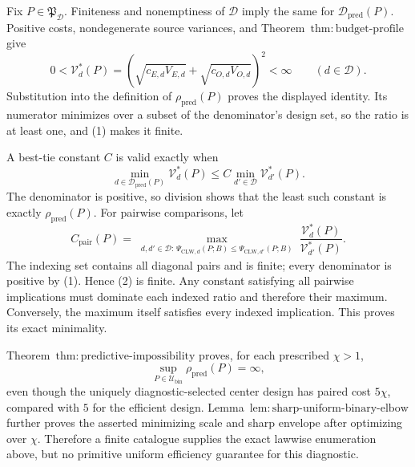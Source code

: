 Fix \(P\in\mathfrak P_{\mathcal D}\).  Finiteness and nonemptiness of \(\mathcal D\) imply the same for \(\mathcal D_{\mathrm{pred}}(P)\).  Positive costs, nondegenerate source variances, and Theorem~\(\mathrm{thm{:}budget\text{-}profile}\) give
\[
 0<\mathcal V_d^*(P)
 =\left(\sqrt{c_{E,d}V_{E,d}}+\sqrt{c_{O,d}V_{O,d}}\right)^2<\infty
 \qquad(d\in\mathcal D). \tag{1}
\]
Substitution into the definition of \(\rho_{\mathrm{pred}}(P)\) proves the displayed identity.  Its numerator minimizes over a subset of the denominator's design set, so the ratio is at least one, and (1) makes it finite.

A best-tie constant \(C\) is valid exactly when
\[
 \min_{d\in\mathcal D_{\mathrm{pred}}(P)}\mathcal V_d^*(P)
 \le C\min_{d'\in\mathcal D}\mathcal V_{d'}^*(P).
\]
The denominator is positive, so division shows that the least such constant is exactly \(\rho_{\mathrm{pred}}(P)\).  For pairwise comparisons, let
\[
 C_{\mathrm{pair}}(P)=
 \max_{\substack{d,d'\in\mathcal D:\,
 \Psi_{\mathrm{CLW},d}(P;B)\le\Psi_{\mathrm{CLW},d'}(P;B)}}
 \frac{\mathcal V_d^*(P)}{\mathcal V_{d'}^*(P)}. \tag{2}
\]
The indexing set contains all diagonal pairs and is finite; every denominator is positive by (1).  Hence (2) is finite.  Any constant satisfying all pairwise implications must dominate each indexed ratio and therefore their maximum.  Conversely, the maximum itself satisfies every indexed implication.  This proves its exact minimality.

Theorem~\(\mathrm{thm{:}predictive\text{-}impossibility}\) proves, for each prescribed \(\chi>1\),
\[
 \sup_{P\in\mathcal U_{\mathrm{bin}}}\rho_{\mathrm{pred}}(P)=\infty,
\]
even though the uniquely diagnostic-selected center design has paired cost \(5\chi\), compared with \(5\) for the efficient design.  Lemma~\(\mathrm{lem{:}sharp\text{-}uniform\text{-}binary\text{-}elbow}\) further proves the asserted minimizing scale and sharp envelope after optimizing over \(\chi\).  Therefore a finite catalogue supplies the exact lawwise enumeration above, but no primitive uniform efficiency guarantee for this diagnostic.